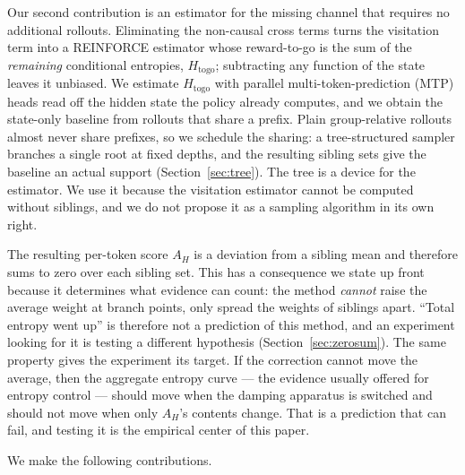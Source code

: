 \documentclass[11pt]{article}
\newcommand{\Htogo}{H_{\mathrm{togo}}}
\newcommand{\AH}{A_{H}}
\begin{document}
Our second contribution is an estimator for the missing channel that requires no
additional rollouts. Eliminating the non-causal cross terms turns the visitation
term into a REINFORCE estimator whose reward-to-go is the sum of the
\emph{remaining} conditional entropies, $\Htogo$; subtracting any function of the
state leaves it unbiased. We estimate $\Htogo$ with parallel
multi-token-prediction (MTP) heads read off the hidden state the policy already
computes, and we obtain the state-only baseline from rollouts that share a prefix.
Plain group-relative rollouts almost never share prefixes, so we schedule the
sharing: a tree-structured sampler branches a single root at fixed depths, and the
resulting sibling sets give the baseline an actual support
(Section~\ref{sec:tree}). The tree is a device for the estimator. We use it because
the visitation estimator cannot be computed without siblings, and we do not propose
it as a sampling algorithm in its own right.

The resulting per-token score $\AH$ is a deviation from a sibling mean and therefore
sums to zero over each sibling set. This has a consequence we state up front because
it determines what evidence can count: the method \emph{cannot} raise the average
weight at branch points, only spread the weights of siblings apart. ``Total entropy
went up'' is therefore not a prediction of this method, and an experiment looking
for it is testing a different hypothesis (Section~\ref{sec:zerosum}). The same
property gives the experiment its target. If the correction cannot move the average,
then the aggregate entropy curve --- the evidence usually offered for entropy control
--- should move when the damping apparatus is switched and should not move when only
$\AH$'s contents change. That is a prediction that can fail, and testing it is the
empirical center of this paper.

We make the following contributions.
\end{document}
